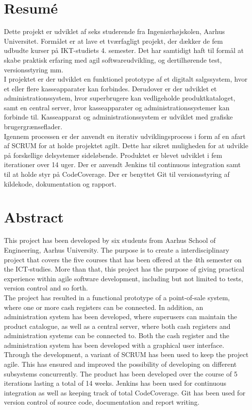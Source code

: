 \section*{Resumé}
Dette projekt er udviklet af seks studerende fra Ingeniørhøjskolen, Aarhus Universitet. Formålet er at lave et tværfagligt projekt, der dækker de fem udbudte kurser på IKT-studiets 4. semester. Det har samtidigt haft til formål at skabe praktisk erfaring med agil softwareudvikling, og dertilhørende test, versionsstyring mm.\\

I projektet er der udviklet en funktionel prototype af et digitalt salgssystem, hvor et eller flere kasseapparater kan forbindes. Derudover er der udviklet et administrationssystem, hvor superbrugere kan vedligeholde produktkataloget, samt en central server, hvor kasseapparater og administrationssystemer kan forbinde til. Kasseapparat og administrationssystem er udviklet med grafiske brugergrænseflader.\\

Igennem processen er der anvendt en iterativ udviklingsprocess i form af en afart af SCRUM for at holde projektet agilt. Dette har sikret muligheden for at udvikle på forskellige delsystemer sideløbende. Produktet er blevet udviklet i fem iterationer over 14 uger. Der er anvendt Jenkins til continuous integration samt til at holde styr på CodeCoverage. Der er benyttet Git til versionsstyring af kildekode, dokumentation og rapport. \\


\section*{Abstract}
This project has been developed by six students from Aarhus School of Engineering, Aarhus University. The purpose is to create a interdisciplinary project that covers the five courses that has been offered at the 4th semester on the ICT-studies. More than that, this project has the purpose of giving practical experience within agile software development, including but not limited to tests, version control and so forth.\\

The project has resulted in a functional prototype of a point-of-sale system, where one or more cash registers can be connected. In addition, an administration system has been developed, where superusers can maintain the product catalogue, as well as a central server, where both cash registers and administration systems can be connected to. Both the cash register and the administration system has been developed with a graphical user interface. \\

Through the development, a variant of SCRUM has been used to keep the project agile. This has ensured and improved the possibility of developing on different subsystems concurrently. The product has been developed over the course of 5 iterations lasting a total of 14 weeks. Jenkins has been used for continuous integration as well as keeping track of total CodeCoverage. Git has been used for version control of source code, documentation and report writing. \\

